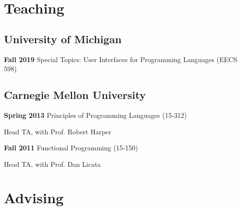 \documentclass[10pt,letterpaper]{article}
\renewenvironment{itemize}{
  \begin{list}{}{
    \setlength{\leftmargin}{1.25em}
    \setlength{\itemsep}{0.25em}
    \setlength{\parskip}{0pt}
    \setlength{\parsep}{0.2em}
  }
}{
  \end{list}
}
\begin{document}
%


\section*{Teaching}
\subsection*{University of Michigan}
\begin{itemize}
  \item \textbf{Fall 2019} \quad Special Topics: User Interfaces for Programming Languages (EECS 598)
\end{itemize}

\subsection*{Carnegie Mellon University}
\begin{itemize}
  \item \textbf{Spring 2013} \quad Principles of Programming Languages (15-312)
    \begin{itemize}
      \item Head TA, with Prof. Robert Harper
    \end{itemize}
  \item \textbf{Fall 2011} \quad Functional Programming (15-150)
    \begin{itemize}
      \item Head TA, with Prof. Dan Licata
    \end{itemize}
\end{itemize}


\section*{Advising}
\end{document}
